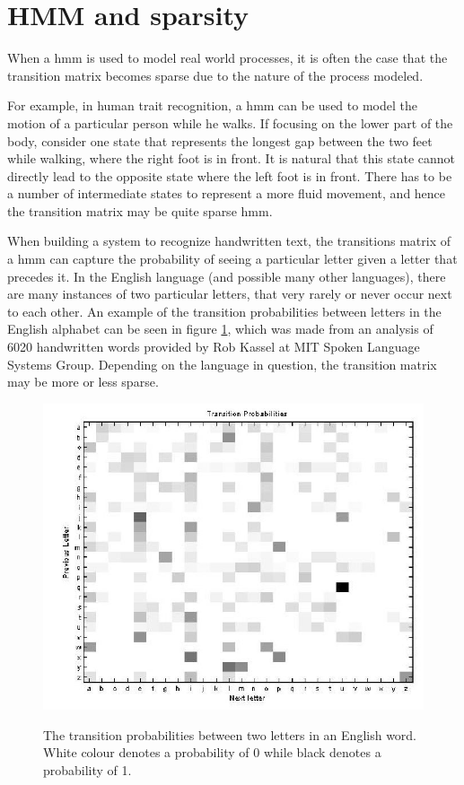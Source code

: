 \section{HMM and sparsity}
When a \gls{hmm} is used to model real world processes, it is often the case that the transition matrix becomes sparse due to the nature of the process modeled.

For example, in human trait recognition, a \gls{hmm} can be used to model the motion of a particular person while he walks.
If focusing on the lower part of the body, consider one state that represents the longest gap between the two feet while walking, where the right foot is in front. It is natural that this state cannot directly lead to the opposite state where the left foot is in front. There has to be a number of intermediate states to represent a more fluid movement, and hence the transition matrix may be quite sparse \gls{hmm}.

When building a system to recognize handwritten text, the transitions matrix of a \gls{hmm} can capture the probability of seeing a particular letter given a letter that precedes it.
In the English language (and possible many other languages), there are many instances of two particular letters, that very rarely or never occur next to each other. An example of the transition probabilities between letters in the English alphabet can be seen in figure \ref{fig:ocr-transitions}, which was made from an analysis of 6020 handwritten words provided by Rob Kassel at MIT Spoken Language Systems Group. Depending on the language in question, the transition matrix may be more or less sparse.

\begin{figure}
\includegraphics[scale=0.4]{pictures/ocr-transitions.jpg}
\label{fig:ocr-transitions}
\caption{The transition probabilities between two letters in an English word. White colour denotes a probability of 0 while black denotes a probability of 1.}
\end{figure}